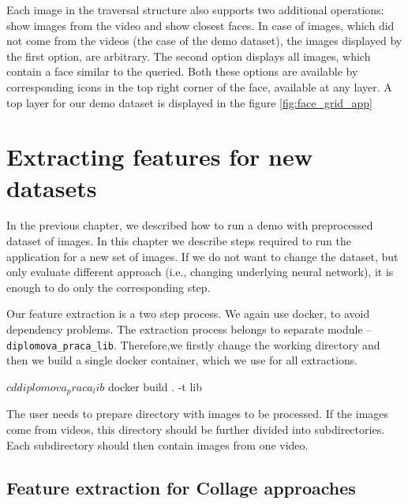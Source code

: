 Each image in the traversal structure also supports two additional operations: show images from the video and show closest faces. In case of images, which did not come from the videos (the case of the demo dataset), the images displayed by the first option, are arbitrary. The second option displays all images, which contain a face similar to the queried. Both these options are available by corresponding icons in the top right corner of the face, available at any layer. A top layer for our demo dataset is displayed in the figure \ref{fig:face_grid_app}










\chapter{Extracting features for new datasets}
\label{ch:custom_dataset}

In the previous chapter, we described how to run a demo with preprocessed dataset of images. In this chapter we describe steps required to run the application for a new set of images. If we do not want to change the dataset, but only evaluate different approach (i.e., changing underlying neural network), it is enough to do only the corresponding step.

Our feature extraction is a two step process. We again use docker, to avoid dependency problems. The extraction process belongs to separate module -- \verb+diplomova_praca_lib+. Therefore,we  firstly change the working directory and then we build a single docker container, which we use for all extractions.

\vspace{0.5cm}
\begin{boxedverbatim}
$ cd diplomova_praca_lib
$ docker build . -t lib
\end{boxedverbatim}
\vspace{0.5cm}

The user needs to prepare directory with images to be processed. If the images come from videos, this directory should be further divided into subdirectories. Each subdirectory should then contain images from one video.

\section{Feature extraction for Collage approaches}

